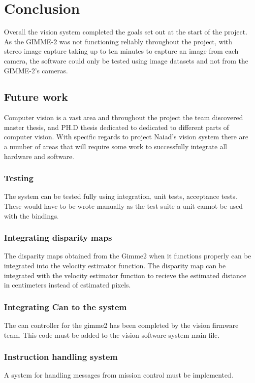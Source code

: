\section{Conclusion}\label{sec:conclusion}
Overall the vision system completed the goals set out at the start of the project. As the GIMME-2 was not functioning reliably throughout the project, with stereo image capture taking up to ten minutes to capture an image from each camera, the software could only be tested using image datasets and not from the GIMME-2's cameras. 
\subsection{Future work}
Computer vision is a vast area and throughout the project the team discovered master thesis, and PH.D thesis dedicated to dedicated to different parts of computer vision. With specific regards to project Naiad's vision system there are a number of areas that will require some work to successfully integrate all hardware and software.
\subsubsection{Testing}
The system can be tested fully using integration, unit tests, acceptance tests. These would have to be wrote manually as the test suite a-unit cannot be used with the bindings.

\subsubsection{Integrating disparity maps}
The disparity maps obtained from the Gimme2 when it functions properly can be integrated into the velocity estimator function.
The disparity map can be integrated with the velocity estimator function to recieve the estimated distance in centimeters instead of estimated pixels.

\subsubsection{Integrating Can to the system}
The can controller for the gimme2 has been completed by the vision firmware team. This code must be added to the vision software system main file.

\subsubsection{Instruction handling system}
A system for handling messages from mission control must be implemented.

